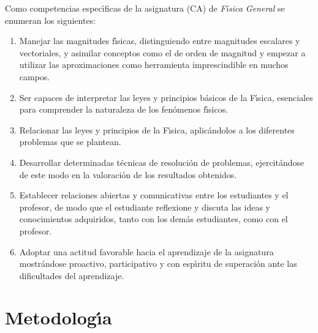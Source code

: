 Como competencias espec\'{\i}ficas de
 la asignatura (CA) de {\it  F\'{\i}sica General} 
se  enumeran los siguientes:
\begin{enumerate}[{CA}1:]
\item Manejar las magnitudes f\'{\i}sicas, distinguiendo entre magnitudes
 escalares y vectoriales, y asimilar conceptos como el de orden
 de magnitud y empezar a utilizar
 las aproximaciones como herramienta imprescindible en muchos campos.

\item Ser capaces de interpretar
 las leyes y principios b\'{a}sicos de la F\'{\i}sica,
 esenciales para comprender la naturaleza de los 
fen\'{o}menos f\'{\i}sicos.

\item  Relacionar las leyes y principios de la F\'{\i}sica, 
aplic\'{a}ndolos a los diferentes problemas que se plantean.

\item Desarrollar  determinadas t\'{e}cnicas de resoluci\'{o}n de problemas,
  ejercit\'{a}ndose de
 este modo en la valoraci\'{o}n de los resultados obtenidos.


\item Establecer relaciones abiertas y comunicativas entre
 los estudiantes y el profesor, de modo que el 
estudiante reflexione y discuta las ideas y conocimientos adquiridos,
 tanto con los dem\'{a}s estudiantes,
como con el profesor.

\item Adoptar una actitud favorable hacia el aprendizaje de la 
asignatura mostr\'{a}ndose proactivo, participativo y con esp\'{\i}ritu 
de superaci\'{o}n ante las dificultades del aprendizaje.

\end{enumerate}




\newpage
\section{Metodolog\'{\i}a}

